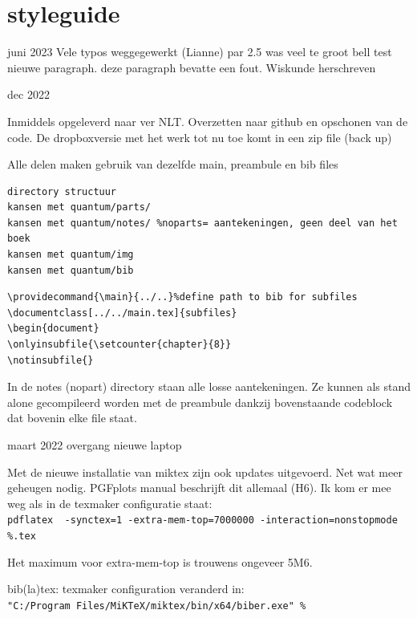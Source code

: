 \documentclass[../../main.tex]{subfiles}
\begin{document}
\onlyinsubfile{\setcounter{chapter}{10}}
\notinsubfile{}
\chapter{styleguide}
\onlyinsubfile{
\marginpar{\vspace{0cm}
\textcolor{red}{ hoofdstuk is los gecompileerd, hstk nummer is 1}}
}
\notinsubfile{
\marginpar{\vspace{0cm}
\textcolor{red}{main.tex gecompileerd, nummering zou moeten kloppen}}
}

juni 2023
Vele typos weggegewerkt (Lianne)
par 2.5 was veel te groot bell test nieuwe paragraph. deze paragraph bevatte een fout. Wiskunde herschreven
 
dec 2022

Inmiddels opgeleverd naar ver NLT.
Overzetten naar github en opschonen van de code.
De dropboxversie met het werk tot nu toe komt in een zip file
(back up)

Alle delen maken gebruik van dezelfde main, preambule en bib files

\begin{verbatim}
directory structuur
kansen met quantum/parts/
kansen met quantum/notes/ %noparts= aantekeningen, geen deel van het boek
kansen met quantum/img
kansen met quantum/bib
\end{verbatim}

\begin{verbatim}
\providecommand{\main}{../..}%define path to bib for subfiles
\documentclass[../../main.tex]{subfiles}
\begin{document}
\onlyinsubfile{\setcounter{chapter}{8}}
\notinsubfile{}
\end{verbatim}

In de notes (nopart) directory staan alle losse aantekeningen. Ze kunnen als stand alone gecompileerd worden met de preambule dankzij bovenstaande codeblock dat bovenin elke file staat.


maart 2022
overgang nieuwe laptop

Met de nieuwe installatie van miktex zijn ook updates uitgevoerd. Net wat meer geheugen nodig. 
PGFplots manual beschrijft dit allemaal (H6). Ik kom er mee weg als in de texmaker configuratie staat:\\
\verb+pdflatex  -synctex=1 -extra-mem-top=7000000 -interaction=nonstopmode %.tex+

Het maximum voor extra-mem-top is trouwens ongeveer 5M6.

bib(la)tex:
texmaker configuration veranderd in:\\  
\verb+"C:/Program Files/MiKTeX/miktex/bin/x64/biber.exe" %+
\end{document}
